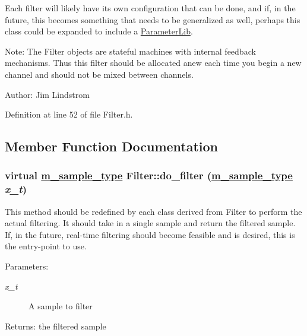 Each filter will likely have its own configuration that can be done, and if, in the future, this becomes something that needs to be generalized as well, perhaps this class could be expanded to include a \hyperlink{classParameterLib}{Parameter\-Lib}.

\begin{Desc}
\item[Note:]The Filter objects are stateful machines with internal feedback mechanisms. Thus this filter should be allocated anew each time you begin a new channel and should not be mixed between channels. \end{Desc}
\begin{Desc}
\item[Author:]Jim Lindstrom \end{Desc}




Definition at line 52 of file Filter.h.

\subsection{Member Function Documentation}
\hypertarget{classFilter_a3}{
\subsubsection[do\_\-filter]{\setlength{\rightskip}{0pt plus 5cm}virtual \hyperlink{Types_8h_a0}{m\_\-sample\_\-type} Filter::do\_\-filter (\hyperlink{Types_8h_a0}{m\_\-sample\_\-type} {\em x\_\-t})}}
\label{classFilter_a3}


This method should be redefined by each class derived from Filter to perform the actual filtering. It should take in a single sample and return the filtered sample. If, in the future, real-time filtering should become feasible and is desired, this is the entry-point to use.

\begin{Desc}
\item[Parameters:]
\begin{description}
\item[{\em x\_\-t}]A sample to filter\end{description}
\end{Desc}
\begin{Desc}
\item[Returns:]the filtered sample \end{Desc}


